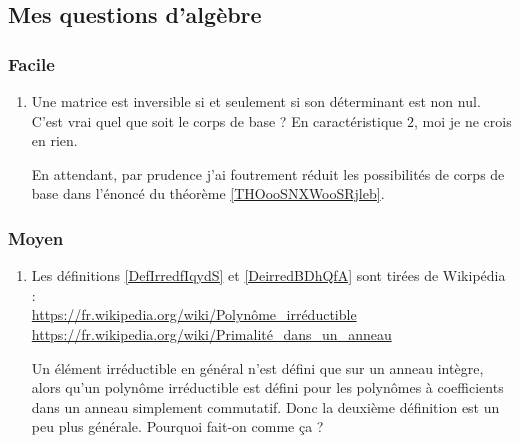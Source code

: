 \subsection{Mes questions d'algèbre}

\subsubsection{Facile}

\begin{enumerate}
    \item
        Une matrice est inversible si et seulement si son déterminant est non nul. C'est vrai quel que soit le corps de base ? En caractéristique \( 2\), moi je ne crois en rien.

        En attendant, par prudence j'ai foutrement réduit les possibilités de corps de base dans l'énoncé du théorème \ref{THOooSNXWooSRjleb}.
\end{enumerate}

\subsubsection{Moyen}

\begin{enumerate}
    \item
        Les définitions \ref{DefIrredfIqydS} et \ref{DeirredBDhQfA} sont tirées de Wikipédia :\\
        \url{https://fr.wikipedia.org/wiki/Polynôme_irréductible}\\
        \url{https://fr.wikipedia.org/wiki/Primalité_dans_un_anneau}

        Un élément irréductible en général n'est défini que sur un anneau intègre, alors qu'un polynôme irréductible est défini pour les polynômes à coefficients dans un anneau simplement commutatif. Donc la deuxième définition est un peu plus générale. Pourquoi fait-on comme ça ?

\end{enumerate}

